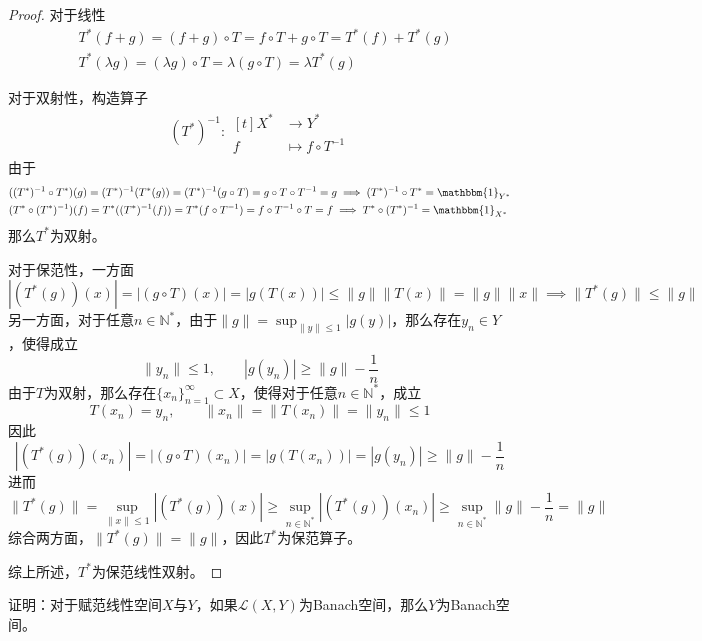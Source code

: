 \documentclass[lang = cn, scheme = chinese, 10pt]{elegantbook}
\newcommand{\N}{\mathbb{N}}  %
\newcommand{\sub}{\subset}   %
\begin{document}
\begin{proof}
	对于线性
	\begin{align*}
		& T^*(f+g)=(f+g)\circ T=f\circ T+g\circ T=T^*(f)+T^*(g)\\
		& T^*(\lambda g)=(\lambda g)\circ T=\lambda(g\circ T)=\lambda T^*(g)
	\end{align*}

	对于双射性，构造算子
	\begin{align*}
		(T^*)^{-1}:\begin{aligned}[t]
			X^*&\longrightarrow Y^*\\
			f&\longmapsto f\circ T^{-1}
		\end{aligned}
	\end{align*}
	由于
	\begin{align*}
		& ((T^*)^{-1}\circ T^*)(g)
		= (T^*)^{-1}(T^*(g))
		= (T^*)^{-1}(g\circ T)
		= g\circ T\circ T^{-1}
		= g
		\implies
		(T^*)^{-1}\circ T^*=\mathbbm{1}_{Y^*}\\
		& (T^*\circ (T^*)^{-1})(f)
		= T^*((T^*)^{-1}(f))
		= T^*(f\circ T^{-1})
		= f\circ T^{-1}\circ T
		= f
		\implies
		T^*\circ (T^*)^{-1} = \mathbbm{1}_{X^*}
	\end{align*}
	那么$T^*$为双射。
	
	对于保范性，一方面
	$$
	|(T^*(g))(x)|
	= |(g\circ T)(x)|
	= |g(T(x))|
	\le \|g\|\|T(x)\|
	= \|g\|\|x\|\implies
	\|T^*(g)\|\le \|g\|
	$$
	另一方面，对于任意$n\in\N^*$，由于$\displaystyle\|g\|=\sup_{\|y\|\le 1}|g(y)|$，那么存在$y_n\in Y$，使得成立
	$$
	\|y_n\|\le 1,\qquad |g(y_n)|\ge \|g\|-\frac{1}{n}
	$$
	由于$T$为双射，那么存在$\{x_n\}_{n=1}^{\infty}\sub X$，使得对于任意$n\in\N^*$，成立
	$$
	T(x_n)=y_n,\qquad \|x_n\|=\|T(x_n)\|=\|y_n\|\le 1
	$$
	因此
	$$
	|(T^*(g))(x_n)|
	= |(g\circ T)(x_n)|
	= |g(T(x_n))|
	= |g(y_n)|
	\ge \|g\|-\frac{1}{n}
	$$
	进而
	$$
	\|T^*(g)\|
	= \sup_{\|x\|\le 1}|(T^*(g))(x)|
	\ge \sup_{n\in\N^*}|(T^*(g))(x_n)|
	\ge \sup_{n\in\N^*}\|g\|-\frac{1}{n}
	= \|g\|
	$$
	综合两方面，$\|T^*(g)\|=\|g\|$，因此$T^*$为保范算子。
	
	综上所述，$T^*$为保范线性双射。
\end{proof}

\begin{proposition}
	证明：对于赋范线性空间$X$与$Y$，如果$\mathcal{L}(X,Y)$为Banach空间，那么$Y$为Banach空间。
\end{proposition}
\end{document}
